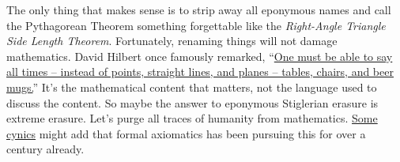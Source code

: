The only thing that makes sense is to strip away all eponymous names and
call the Pythagorean Theorem something forgettable like the
\emph{Right-Angle Triangle Side Length Theorem}. Fortunately, renaming
things will not damage mathematics. David Hilbert once famously
remarked, ``\href{https://quotefancy.com/quote/1237279/David-Hilbert-One-must-be-able-to-say-at-all-times-instead-of-points-straight-lines-and}{One
must be able to say all times -- instead of points, straight lines, and
planes -- tables, chairs, and beer mugs.}'' It's the mathematical
content that matters, not the language used to discuss the content. So
maybe the answer to eponymous Stiglerian erasure is extreme erasure.
Let's purge all traces of humanity from mathematics.
\href{https://sites.math.rutgers.edu/~zeilberg/OPINIONS.html}{Some
cynics} might add that formal axiomatics has been pursuing this for over
a century already.

%

